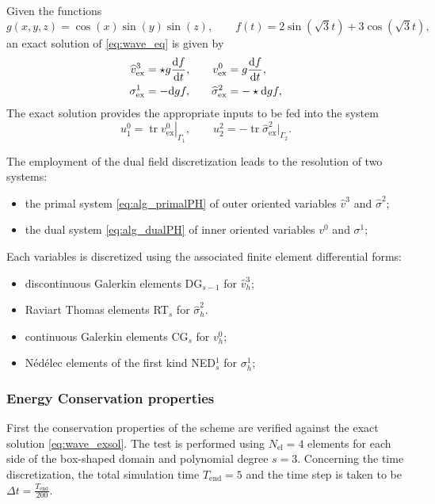 \documentclass{elsarticle}
\newcommand{\revTwo}[1]{{\color{black}#1}}
\renewcommand\d{\ensuremath{\mathrm{d}}}
\DeclareMathOperator{\tr}{tr}
\newcommand*{\dual}[1]{\ensuremath{\widehat{#1}}}
\begin{document}
Given the functions
\begin{equation}
    g(x, y, z) = \cos(x) \sin(y) \sin(z), \qquad f(t) = 2 \sin(\sqrt{3} t) + 3 \cos(\sqrt{3} t),
\end{equation}
an exact solution of \eqref{eq:wave_eq} is given by
\begin{equation}\label{eq:wave_exsol}
\begin{aligned}
\dual{v}^3_{\mathrm{ex}} &= \star g \diff{f}{t}, \\    
\sigma^1_{\mathrm{ex}} &= -\d{g} f, 
\end{aligned} \qquad 
\begin{aligned}
v^0_{\mathrm{ex}} &= g \diff{f}{t}, \\
\dual{\sigma}^2_{\mathrm{ex}} &= -\star \d{g} f,
\end{aligned}
\end{equation}
The exact solution provides the appropriate inputs to be fed into the system
\begin{equation}
    u^0_1 = \left. \tr v^0_{\mathrm{ex}} \right\vert_{\Gamma_1}, \qquad u^{2}_2 =  -\tr \dual{\sigma}^2_{\mathrm{ex}} \vert_{\Gamma_2}.
\end{equation}

\revTwo{The employment of the dual field discretization leads to the resolution of two systems:
\begin{itemize}
    \item the primal system \eqref{eq:alg_primalPH} of outer oriented variables $\dual{v}^3$ and $\dual{\sigma}^2$;
    \item the dual system \eqref{eq:alg_dualPH} of inner oriented variables $v^0$ and $\sigma^1$;
\end{itemize}
Each variables is discretized using the associated finite element differential forms:
\begin{itemize}
    \item discontinuous Galerkin elements DG$_{s-1}$ for $\dual{v}^3_h$;
    \item Raviart Thomas elements RT$_s$ for $\dual{\sigma}^2_h$.
    \item continuous Galerkin elements CG$_s$ for $v^0_h$;
    \item Nédélec elements of the first kind NED$_s^1$ for $\sigma^1_h$;
\end{itemize}
}

\subsubsection{Energy Conservation properties}
First the conservation properties of the scheme are verified against the exact solution \eqref{eq:wave_exsol}. The test is performed using $N_{\text{el}}=4$ elements for each side of the box-shaped domain and polynomial degree $s=3$. Concerning the time discretization, the total simulation time $T_{\text{end}}=5$ and the time step is taken to be $\Delta t= \frac{T_{\text{end}}}{200}$. \\
\end{document}
